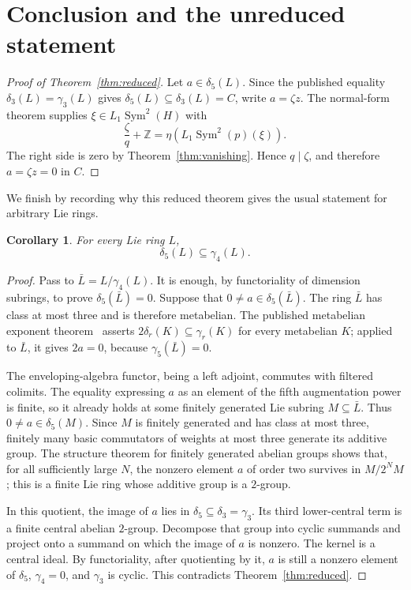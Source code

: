 \documentclass[11pt]{amsart}
\newtheorem{corollary}[theorem]{Corollary}
\theoremstyle{remark}
\newcommand{\Z}{\mathbb Z}
\newcommand{\Sym}{\operatorname{Sym}}
\newcommand{\gm}{\gamma}
\newcommand{\dlt}{\delta}
\begin{document}
\section{Conclusion and the unreduced statement}

\begin{proof}[Proof of Theorem~\ref{thm:reduced}]
Let $a\in\dlt_5(L)$.  Since the published equality
$\dlt_3(L)=\gm_3(L)$ gives
$\dlt_5(L)\subseteq\dlt_3(L)=C$, write $a=\zeta z$.
The normal-form theorem supplies $\xi\in L_1\Sym^2(H)$ with
\[
 \frac\zeta q+\Z
 =\eta(L_1\Sym^2(p)(\xi)).
\]
The right side is zero by Theorem~\ref{thm:vanishing}.  Hence
$q\mid\zeta$, and therefore $a=\zeta z=0$ in $C$.
\end{proof}

We finish by recording why this reduced theorem gives the usual
statement for arbitrary Lie rings.

\begin{corollary}\label{cor:global}
For every Lie ring $L$,
\[
                         \dlt_5(L)\subseteq\gm_4(L).
\]
\end{corollary}

\begin{proof}
Pass to $\bar L=L/\gm_4(L)$.  It is enough, by functoriality of
dimension subrings, to prove $\dlt_5(\bar L)=0$.  Suppose that
$0\ne a\in\dlt_5(\bar L)$.  The ring $\bar L$ has class at most three
and is therefore metabelian.  The published metabelian exponent
theorem~\cite[Theorem~2.1]{PS} asserts
$2\dlt_r(K)\subseteq\gm_r(K)$ for every metabelian $K$; applied to
$\bar L$, it gives $2a=0$, because
$\gm_5(\bar L)=0$.

The enveloping-algebra functor, being a left adjoint, commutes with
filtered colimits.  The equality expressing $a$ as an element of the
fifth augmentation power is finite, so it already holds at some
finitely generated Lie subring $M\subseteq\bar L$.  Thus
$0\ne a\in\dlt_5(M)$.  Since $M$ is finitely generated and has class
at most three, finitely many basic commutators of weights at most three
generate its additive group.  The structure theorem for finitely
generated abelian groups shows that, for all sufficiently large $N$,
the nonzero element $a$ of order two survives in $M/2^NM$; this is a finite
Lie ring whose additive group is a $2$-group.

In this quotient, the image of $a$ lies in
$\dlt_5\subseteq\dlt_3=\gm_3$.  Its third lower-central term is a
finite central abelian $2$-group.
Decompose that group into cyclic summands and project onto a summand on
which the image of $a$ is nonzero.  The kernel is a central ideal.
By functoriality, after quotienting by it, $a$ is still a nonzero
element of $\dlt_5$,
$\gm_4=0$, and $\gm_3$ is cyclic.  This contradicts
Theorem~\ref{thm:reduced}.
\end{proof}
\end{document}
